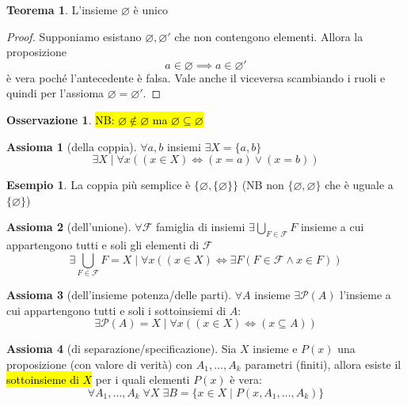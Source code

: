\documentclass[a4paper,10pt]{article}
\theoremstyle{definition}
\theoremstyle{indentdefinition}
\theoremstyle{indentpostulate}
\newtheorem{axiom}{Assioma}[section]
\theoremstyle{indenttheorem}
\newtheorem{thm}{Teorema}[section]
\theoremstyle{myremark}
\newtheorem*{rem*}{Osservazione}
\newtheorem{example*}{Esempio}
\theoremstyle{indentgeneral}
\begin{document}
\begin{thm}
    L'insieme $\varnothing$ è unico
\end{thm}

\begin{proof}
    Supponiamo esistano $\varnothing,\varnothing'$ che non contengono elementi. Allora la proposizione 
   $$a\in\varnothing\implies a\in\varnothing'$$
    è vera poché l'antecedente è falsa. Vale anche il viceversa scambiando i ruoli e quindi per l'assioma  $\varnothing=\varnothing'$.
\end{proof}

\begin{rem*}
    \hl{NB: $\varnothing\notin\varnothing$ ma $\varnothing\subseteq\varnothing$}
\end{rem*}

\begin{axiom}[della coppia]\label{axm-coppia}
    $\forall a,b$ insiemi $\exists X=\{a,b\}$
    $$\exists X\mid \forall x((x\in X)\iff (x=a)\lor(x=b))$$
\end{axiom}

\begin{example*}
    La coppia più semplice è $\{\varnothing,\{\varnothing\}\}$ (NB non $\{\varnothing,\varnothing\}$ che è uguale a $\{\varnothing\}$)
\end{example*}

\begin{axiom}[dell'unione]\label{axm-unione}
    $\forall \mathscr{F}$ famiglia di insiemi $\exists \bigcup_{F\in\mathscr{F}}F$ insieme a cui appartengono tutti e soli gli elementi di $\mathscr{F}$
    $$\exists \bigcup_{F\in\mathscr{F}}F=X\mid \forall x((x\in X)\iff \exists F(F\in\mathscr{F}\land x\in F))$$
\end{axiom}

\begin{axiom}[dell'insieme potenza/delle parti]\label{axm-insieme-parti}
    $\forall A$ insieme $\exists\mathscr{P}(A)$ l'insieme a cui appartengono tutti e soli i sottoinsiemi di $A$:
    $$\exists\mathscr{P}(A)=X\mid\forall x((x\in X)\iff(x\subseteq A))$$
\end{axiom}

\begin{axiom}[di separazione/specificazione]\label{axm-separazione}
    Sia $X$ insieme e $P(x)$ una proposizione (con valore di verità) con $A_1,\dots,A_k$ parametri (finiti), allora esiste il \hl{sottoinsieme di $X$} per i quali elementi $P(x)$ è vera:
    $$\forall A_1,\dots,A_k\;\forall X\;\exists B=\{x\in X\mid P(x,A_1,\dots,A_k)\}$$
\end{axiom}
\end{document}
